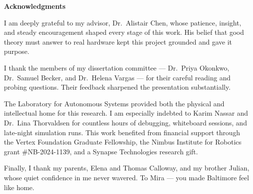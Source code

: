 \documentclass[12pt,oneside]{report}
\begin{document}
\clearpage

\thispagestyle{empty}
{}
\begin{center}
  {\LARGE\bfseries\color{jhublue} Acknowledgments}
\end{center}
\vspace{16pt}

I am deeply grateful to my advisor, Dr.\ Alistair Chen, whose patience, insight,
and steady encouragement shaped every stage of this work. His belief that good theory
must answer to real hardware kept this project grounded and gave it purpose.

I thank the members of my dissertation committee --- Dr.\ Priya Okonkwo, Dr.\ Samuel
Becker, and Dr.\ Helena Vargas --- for their careful reading and probing questions.
Their feedback sharpened the presentation substantially.

The Laboratory for Autonomous Systems provided both the physical and intellectual
home for this research. I am especially indebted to Karim Nassar and Dr.\ Lina
Thorvaldsen for countless hours of debugging, whiteboard sessions, and late-night
simulation runs. This work benefited from financial support through the Vertex
Foundation Graduate Fellowship, the Nimbus Institute for Robotics grant \#NB-2024-1139,
and a Synapse Technologies research gift.

Finally, I thank my parents, Elena and Thomas Calloway, and my brother Julian,
whose quiet confidence in me never wavered. To Mira --- you made Baltimore feel
like home.

\clearpage

{}
\renewcommand{\contentsname}{\centering\LARGE\bfseries\color{jhublue} Table of Contents}
\tableofcontents
\cleardoublepage

{}
\renewcommand{\listfigurename}{\centering\LARGE\bfseries\color{jhublue} List of Figures}
\listoffigures
{}
\renewcommand{\listtablename}{\centering\LARGE\bfseries\color{jhublue} List of Tables}
\listoftables
\cleardoublepage

\end{document}
